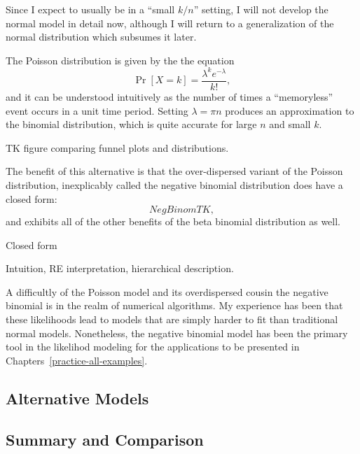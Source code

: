 Since I expect to usually be in a ``small $k/n$'' setting, I will not
develop the normal model in detail now, although I will return to a
generalization of the normal distribution which subsumes it later.

The Poisson distribution is given by the the equation
\[
\Pr[X=k] = \frac{\lambda^k e^{-\lambda}}{k!},
\]
and it can be understood intuitively as the number of times a
``memoryless'' event occurs in a unit time period.  Setting $\lambda =
\pi n$ produces an approximation to the binomial distribution, which
is quite accurate for large $n$ and small $k$.

TK figure comparing funnel plots and distributions.

The benefit of this alternative is that the over-dispersed variant of
the Poisson distribution, inexplicably called the negative binomial
distribution does have a closed form:
\[
Neg Binom TK,
\]
and exhibits all of the other benefits of the beta binomial
distribution as well.

Closed form

Intuition, RE interpretation, hierarchical description.

A difficultly of the Poisson model and its overdispersed cousin the
negative binomial is in the realm of numerical algorithms.  My
experience has been that these likelihoods lead to models that are
simply harder to fit than traditional normal models.  Nonetheless, the
negative binomial model has been the primary tool in the likelihod
modeling for the applications to be presented in
Chapters~\ref{practice-all-examples}.

\subsection{Alternative Models}

\subsection{Summary and Comparison}
